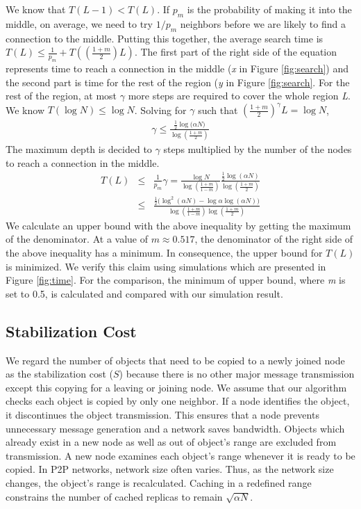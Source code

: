 \documentclass[conference]{IEEEtran}
\begin{document}
We know that $T(L-1) < T(L)$.  If $p_m$ is the probability of making
it into the middle, on average, we need to try $1/p_m$ neighbors before
we are likely to find a connection to the middle.  Putting this together,
the average search time is
$T(L) \leq \frac{1}{p_m} + T((\frac{1+m}{2})L)$. 
The first part of the right side of the equation represents time to reach 
a connection in the middle (\textit{x} in Figure \ref{fig:search}) and 
the second part is time for the rest of the region (\textit{y} in Figure \ref{fig:search}. 
For the rest of the region, at most $\gamma$ more steps are required to 
cover the whole region \textit{L}. We know $T(\log{N}) \leq \log N$. 
Solving for $\gamma$ such that $(\frac{1+m}{2})^{\gamma}L = \log N$, 
\begin{eqnarray*}
\gamma \leq \frac{\frac{1}{2}\log{(\alpha N})}{\log{(\frac{1+m}{2})}}
\end{eqnarray*}
The maximum depth is decided to $\gamma$ steps multiplied by the number of the nodes 
to reach a connection in the middle.
\begin{eqnarray*}
T(L) &\leq& \frac{1}{p_m}\gamma = \frac{\log N}{\log{(\frac{1+m}{1-m})}}\frac{\frac{1}{2}\log{(\alpha N)}}{\log{(\frac{1+m}{2})}}
 \\
     &\leq& \frac{\frac{1}{2}(\log^2 (\alpha N)-\log{\alpha}\log{(\alpha N))}}{\log{(\frac{1+m}{1-m})}\log{(\frac{1+m}{2})}}
\end{eqnarray*}
We calculate an upper bound with the above inequality by getting the maximum 
of the denominator.
At a value of $m\approx0.517$, the denominator of the right side of the above inequality has a minimum. 
In consequence, the upper bound for $T(L)$ is minimized.
We verify this claim using simulations which are presented in Figure \ref{fig:time}. 
For the comparison, the minimum of upper bound, where \textit{m} is set to 0.5, is 
calculated and compared with our simulation result.

\subsection{Stabilization Cost}
\label{sec:stabilization_cost}
We regard the number of objects that need to be copied to 
a newly joined node as the stabilization cost ($S$) 
because there is no other major message transmission 
except this copying for a leaving or joining node. 
We assume that our algorithm checks 
each object is copied by only one neighbor.
If a node identifies the 
object, it discontinues the object transmission. This ensures that a node 
prevents unnecessary message generation and a network saves bandwidth.
Objects which already exist in a new node as well as out of 
object's range are excluded from transmission.
A new node examines each object's range whenever it is ready to be copied.
In P2P networks, network size often varies. Thus, as the network
size changes, the object's range is recalculated.
Caching in a redefined range constrains the number of 
cached replicas to remain $\sqrt{\alpha N}$.
 
\end{document}
